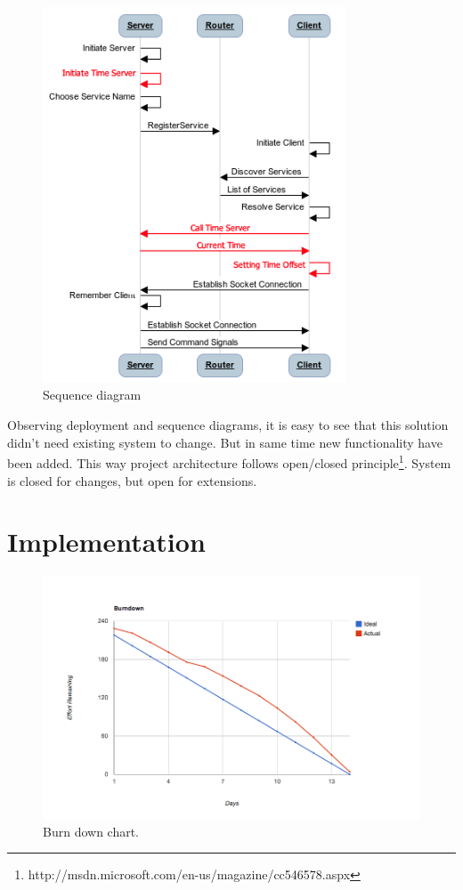 \begin{figure}[H]
	\centering
		\includegraphics[width=9cm]{sprint5/communication}
	\caption{Sequence diagram}
	\label{fig:sprint5_sequence_diagram}
\end{figure}

Observing deployment and sequence diagrams, it is easy to see that this solution didn't need existing system to change. But in same time new functionality have been added. This way project architecture follows open/closed principle\footnote{http://msdn.microsoft.com/en-us/magazine/cc546578.aspx}. System is closed for changes, but open for extensions.

\section{Implementation}

\begin{figure}[H]
	\centering
		\includegraphics[width=18cm]{sprint5/BurndownSprint5.png}
	\caption{Burn down chart.}
	\label{fig:Burn5 }
\end{figure}



